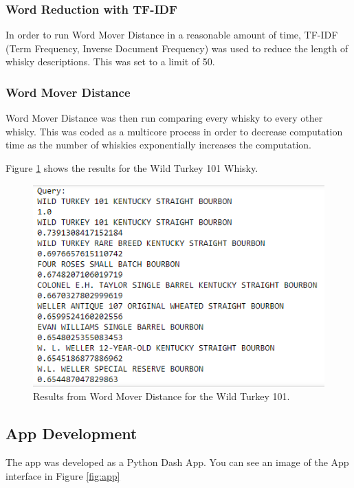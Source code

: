 \documentclass{article}
\begin{document}
\subsubsection{Word Reduction with TF-IDF}
In order to run Word Mover Distance in a reasonable amount of time, TF-IDF (Term Frequency, Inverse Document Frequency) was used to reduce the length of whisky descriptions. This was set to a limit of 50.

\subsubsection{Word Mover Distance}

Word Mover Distance was then run comparing every whisky to every other whisky. This was coded as a multicore process in order to decrease computation time as the number of whiskies exponentially increases the computation.

Figure \ref{fig:wordmover} shows the results for the Wild Turkey 101 Whisky.

\begin{figure}[h]
\includegraphics{wordmover}
\centering
\caption{Results from Word Mover Distance for the Wild Turkey 101.}
\label{fig:wordmover}
\end{figure}  

\subsection{App Development}
The app was developed as a Python Dash App. You can see an image of the App interface in Figure \ref{fig:app}
\end{document}
